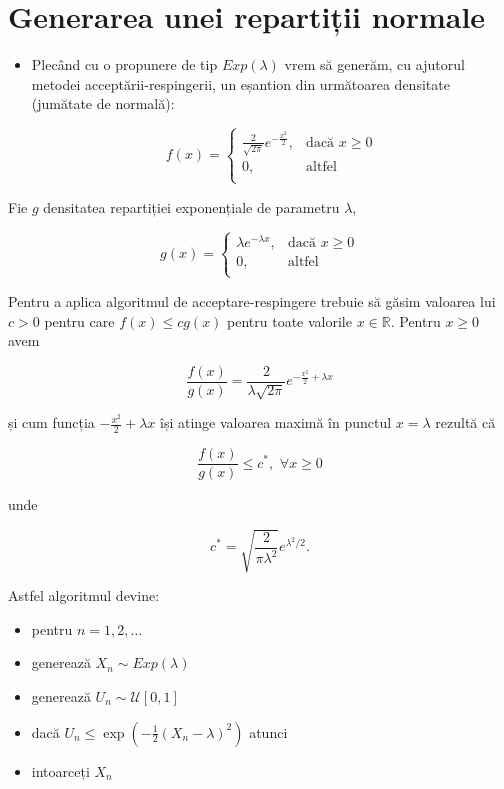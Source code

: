 \documentclass[]{article}
\newenvironment{frshaded*}{%
  \def\FrameCommand{\fboxrule=\FrameRule\fboxsep=\FrameSep \fcolorbox{framecolor}{shadecolor1}}%
  \MakeFramed {\advance\hsize-\width \FrameRestore}}%
{\endMakeFramed}
\newenvironment{rmdblock}[1]
  {\begin{frshaded*}
  \begin{itemize}
  \renewcommand{\labelitemi}{
    \raisebox{-.7\height}[0pt][0pt]{
      {\setkeys{Gin}{width=2em,keepaspectratio}\texttt{[image: images/icons/\#1]}}
    }
  }
  \item
  }
  {
  \end{itemize}
  \end{frshaded*}
  }
\newenvironment{rmdexercise}
  {\begin{rmdblock}{exercise}}
  {\end{rmdblock}}
\begin{document}
\section{Generarea unei repartiții
normale}\label{generarea-unei-repartitii-normale}

\begin{rmdexercise}
Plecând cu o propunere de tip \(Exp(\lambda)\) vrem să generăm, cu
ajutorul metodei acceptării-respingerii, un eșantion din următoarea
densitate (jumătate de normală):

\[
  f(x) = \left\{\begin{array}{ll}
    \frac{2}{\sqrt{2\pi}}e^{-\frac{x^2}{2}}, & \mbox{dacă $x\geq0$}\\
    0, & \mbox{altfel}\\           
  \end{array}\right.
\]
\end{rmdexercise}

Fie \(g\) densitatea repartiției exponențiale de parametru \(\lambda\),

\[
    g(x) = \left\{\begin{array}{ll}
        \lambda e^{-\lambda x}, & \mbox{dacă $x\geq0$}\\
        0, & \mbox{altfel}\\           
  \end{array}\right.
\]

Pentru a aplica algoritmul de acceptare-respingere trebuie să găsim
valoarea lui \(c>0\) pentru care \(f(x)\leq c g(x)\) pentru toate
valorile \(x\in \mathbb{R}\). Pentru \(x\geq0\) avem

\[
  \frac{f(x)}{g(x)}=\frac{2}{\lambda\sqrt{2\pi}}e^{-\frac{x^2}{2}+\lambda x}
\]

și cum funcția \(-\frac{x^2}{2}+\lambda x\) își atinge valoarea maximă
în punctul \(x=\lambda\) rezultă că

\[
    \frac{f(x)}{g(x)}\leq c^*, \,\,\forall x \geq0
\]

unde

\[
  c^*=\sqrt{\frac{2}{\pi\lambda^2}}e^{\lambda^2/2}.
\]

Astfel algoritmul devine:

\begin{itemize}
\item
  pentru \(n=1,2,\dots\)
\item
  generează \(X_n\sim Exp(\lambda)\)
\item
  generează \(U_n\sim\mathcal{U}[0,1]\)
\item
  dacă \(U_n\leq\exp\left(-\frac{1}{2}(X_n-\lambda)^2\right)\) atunci
\item
  intoarceți \(X_n\)
\end{itemize}
\end{document}
